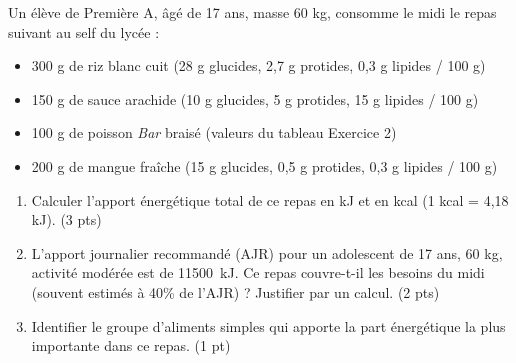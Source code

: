 \documentclass[11pt]{article}
\begin{document}
\begin{exercice}
Un élève de Première A, âgé de 17 ans, masse 60 kg, consomme le midi le repas suivant au self du lycée :
\begin{itemize}
\item 300 g de riz blanc cuit (28 g glucides, 2,7 g protides, 0,3 g lipides / 100 g)
\item 150 g de sauce arachide (10 g glucides, 5 g protides, 15 g lipides / 100 g)
\item 100 g de poisson \textit{Bar} braisé (valeurs du tableau Exercice 2)
\item 200 g de mangue fraîche (15 g glucides, 0,5 g protides, 0,3 g lipides / 100 g)
\end{itemize}

\begin{enumerate}
\item Calculer l'apport énergétique total de ce repas en kJ et en kcal (1 kcal = 4,18 kJ). \hfill (3 pts)
\item L'apport journalier recommandé (AJR) pour un adolescent de 17 ans, 60 kg, activité modérée est de \SI{11500}{kJ}. Ce repas couvre-t-il les besoins du midi (souvent estimés à 40\% de l'AJR) ? Justifier par un calcul. \hfill (2 pts)
\item Identifier le groupe d'aliments simples qui apporte la part énergétique la plus importante dans ce repas. \hfill (1 pt)
\end{enumerate}
\end{exercice}
\end{document}
